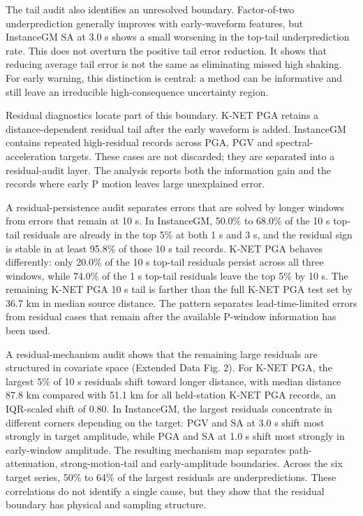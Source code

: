 \documentclass[
  10pt,
]{article}
\begin{document}
The tail audit also identifies an unresolved boundary. Factor-of-two
underprediction generally improves with early-waveform features, but
InstanceGM SA at 3.0 s shows a small worsening in the top-tail
underprediction rate. This does not overturn the positive tail error
reduction. It shows that reducing average tail error is not the same as
eliminating missed high shaking. For early warning, this distinction is
central: a method can be informative and still leave an irreducible
high-consequence uncertainty region.

Residual diagnostics locate part of this boundary. K-NET PGA retains a
distance-dependent residual tail after the early waveform is added.
InstanceGM contains repeated high-residual records across PGA, PGV and
spectral-acceleration targets. These cases are not discarded; they are
separated into a residual-audit layer. The analysis reports both the
information gain and the records where early P motion leaves large
unexplained error.

A residual-persistence audit separates errors that are solved by longer
windows from errors that remain at 10 s. In InstanceGM, 50.0\% to 68.0\%
of the 10 s top-tail residuals are already in the top 5\% at both 1 s
and 3 s, and the residual sign is stable in at least 95.8\% of those 10
s tail records. K-NET PGA behaves differently: only 20.0\% of the 10 s
top-tail residuals persist across all three windows, while 74.0\% of the
1 s top-tail residuals leave the top 5\% by 10 s. The remaining K-NET
PGA 10 s tail is farther than the full K-NET PGA test set by 36.7 km in
median source distance. The pattern separates lead-time-limited errors
from residual cases that remain after the available P-window information
has been used.

A residual-mechanism audit shows that the remaining large residuals are
structured in covariate space (Extended Data Fig. 2). For K-NET PGA, the
largest 5\% of 10 s residuals shift toward longer distance, with median
distance 87.8 km compared with 51.1 km for all held-station K-NET PGA
records, an IQR-scaled shift of 0.80. In InstanceGM, the largest
residuals concentrate in different corners depending on the target: PGV
and SA at 3.0 s shift most strongly in target amplitude, while PGA and
SA at 1.0 s shift most strongly in early-window amplitude. The resulting
mechanism map separates path-attenuation, strong-motion-tail and
early-amplitude boundaries. Across the six target series, 50\% to 64\%
of the largest residuals are underpredictions. These correlations do not
identify a single cause, but they show that the residual boundary has
physical and sampling structure.
\end{document}
